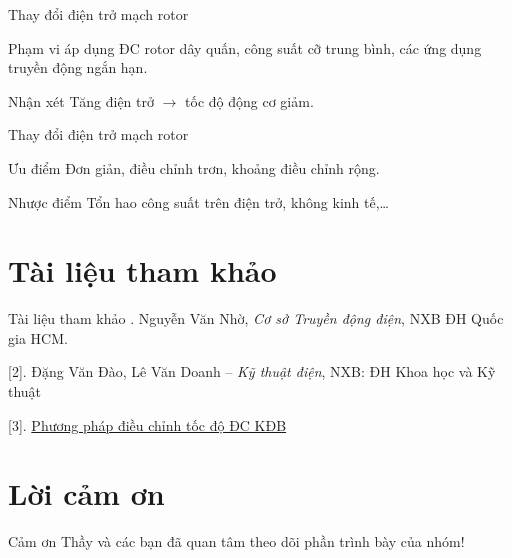\documentclass[20pt]{beamer}
\begin{document}
\begin{frame}{Thay đổi điện trở mạch rotor}
	\begin{block}{Phạm vi áp dụng}
		\justifying
		ĐC rotor dây quấn, công suất cỡ trung bình, các ứng dụng truyền động ngắn hạn.
	\end{block}

	\begin{block}{Nhận xét}
		\textcolor{doden}{Tăng điện trở} $\longrightarrow$ \textcolor{doden}{tốc độ động cơ giảm}.
	\end{block}
\end{frame}

\begin{frame}{Thay đổi điện trở mạch rotor}
	\begin{block}{Ưu điểm}
		\justifying
		Đơn giản, điều chỉnh trơn, khoảng điều chỉnh rộng.
	\end{block}
	
	\begin{block}{Nhược điểm}
		\justifying
		Tổn hao công suất trên điện trở, không kinh tế,\ldots
	\end{block}
\end{frame}

\section*{Tài liệu tham khảo}
\begin{frame}{Tài liệu tham khảo}
\justifying
[1]. Nguyễn Văn Nhờ, \textit{Cơ sở Truyền động điện}, NXB ĐH Quốc gia HCM.

[2]. Đặng Văn Đào, Lê Văn Doanh -- \textit{Kỹ thuật điện}, NXB: ĐH Khoa học và Kỹ thuật

[3]. \href{http://maynenkhitrucvit.com.vn/index.php/ky-thuat/50-dong-co-may-nen-khi/81-phuong-phap-dieu-chinh-toc-do-dong-co-khong-dong-bo.html}{Phương  pháp điều chỉnh tốc độ ĐC KĐB}
\end{frame}
\section*{Lời cảm ơn}
\begin{frame}
\justifying
\large \alert{Cảm ơn Thầy và các bạn đã quan tâm theo dõi phần trình bày của nhóm!}
\end{frame}
\end{document}
